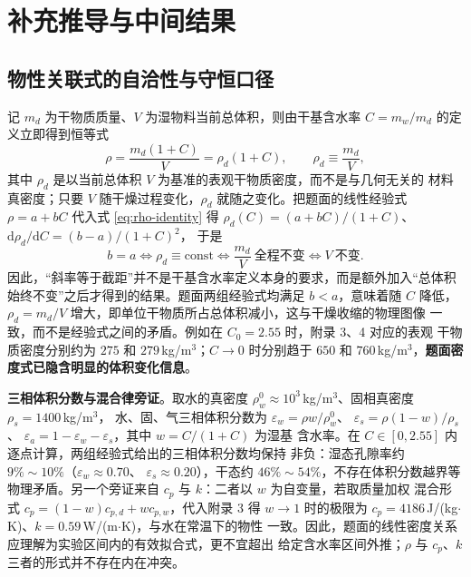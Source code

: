 \documentclass[12pt,a4paper,fontset=none]{ctexart}
\begin{document}
\section{补充推导与中间结果}

\subsection{物性关联式的自洽性与守恒口径}
\label{app:rho}

记 $m_d$ 为干物质质量、$V$ 为湿物料当前总体积，则由干基含水率
$C=m_w/m_d$ 的定义立即得到恒等式
\begin{equation}
  \rho=\frac{m_d(1+C)}{V}
  =\rho_d(1+C),\qquad
  \rho_d\equiv\frac{m_d}{V},
  \label{eq:rho-identity}
\end{equation}
其中 $\rho_d$ 是以当前总体积 $V$ 为基准的表观干物质密度，而不是与几何无关的
材料真密度；只要 $V$ 随干燥过程变化，$\rho_d$ 就随之变化。把题面的线性经验式
$\rho=a+bC$ 代入式 \eqref{eq:rho-identity} 得
$\rho_d(C)=(a+bC)/(1+C)$、$\mathrm{d}\rho_d/\mathrm{d}C=(b-a)/(1+C)^2$，
于是
\begin{equation}
  b=a
  \iff \rho_d\equiv\text{const}
  \iff \frac{m_d}{V}\ \text{全程不变}
  \iff V\ \text{不变}.
  \label{eq:rho-criterion}
\end{equation}
因此，“斜率等于截距”并不是干基含水率定义本身的要求，而是额外加入“总体积
始终不变”之后才得到的结果。题面两组经验式均满足 $b<a$，意味着随 $C$ 降低，
$\rho_d=m_d/V$ 增大，即单位干物质所占总体积减小，这与干燥收缩的物理图像
一致，而不是经验式之间的矛盾。例如在 $C_0=2.55$ 时，附录 3、4 对应的表观
干物质密度分别约为 $275$ 和 $279$\,kg/m$^3$；$C\to0$ 时分别趋于 $650$ 和
$760$\,kg/m$^3$，\textbf{题面密度式已隐含明显的体积变化信息}。

\textbf{三相体积分数与混合律旁证}。取水的真密度
$\rho_w^0\approx10^3$\,kg/m$^3$、固相真密度 $\rho_s=1400$\,kg/m$^3$，
水、固、气三相体积分数为 $\varepsilon_w=\rho w/\rho_w^0$、
$\varepsilon_s=\rho(1-w)/\rho_s$、
$\varepsilon_a=1-\varepsilon_w-\varepsilon_s$，其中 $w=C/(1+C)$ 为湿基
含水率。在 $C\in[0,2.55]$ 内逐点计算，两组经验式给出的三相体积分数均保持
非负：湿态孔隙率约 $9\%\sim10\%$（$\varepsilon_w\approx0.70$、
$\varepsilon_s\approx0.20$），干态约 $46\%\sim54\%$，不存在体积分数越界等
物理矛盾。另一个旁证来自 $c_p$ 与 $k$：二者以 $w$ 为自变量，若取质量加权
混合形式 $c_p=(1-w)c_{p,d}+wc_{p,w}$，代入附录 3 得 $w\to1$ 时的极限为
$c_p=4186$\,J/(kg$\cdot$K)、$k=0.59$\,W/(m$\cdot$K)，与水在常温下的物性
一致。因此，题面的线性密度关系应理解为实验区间内的有效拟合式，更不宜超出
给定含水率区间外推；$\rho$ 与 $c_p$、$k$ 三者的形式并不存在内在冲突。
\end{document}
